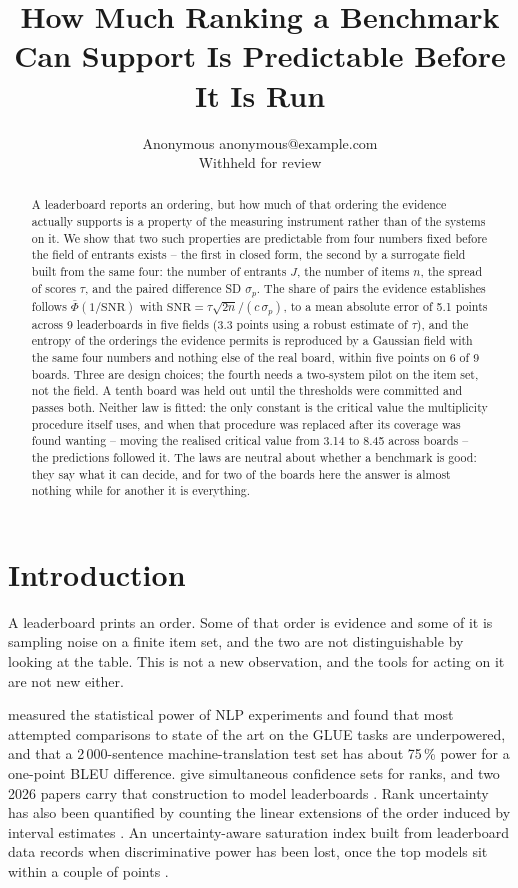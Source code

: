 \documentclass[10pt]{article}
\title{How Much Ranking a Benchmark Can Support Is Predictable Before It Is Run}
\author{\name Anonymous \email anonymous@example.com \\
      \addr Withheld for review}
\begin{document}
\maketitle

\begin{abstract}
A leaderboard reports an ordering, but how much of that ordering the
evidence actually supports is a property of the measuring instrument
rather than of the systems on it. We show that two such properties are
predictable from four numbers fixed before the field of entrants exists --
the first in closed form, the second by a surrogate field built from the
same four: the number of entrants $J$, the number of items $n$, the spread of
scores $\tau$, and the paired difference SD $\sigma_p$.
The share of pairs the evidence establishes follows
$\bar\Phi(1/\mathrm{SNR})$ with $\mathrm{SNR}=\tau\sqrt{2n}/(c\,\sigma_p)$,
to a mean absolute error of 5.1 points across 9 leaderboards in
five fields (3.3 points using a robust estimate of $\tau$), and
the entropy of the orderings the evidence permits is reproduced by a
Gaussian field with the same four numbers and nothing else of the real
board, within five points on 6 of 9 boards.
Three are design choices; the fourth needs a two-system pilot on the item
set, not the field. 
A tenth board was held out until the thresholds were committed and passes
both. Neither law is fitted: the only constant is the critical value the
multiplicity procedure itself uses, and when that procedure was replaced
after its coverage was found wanting -- moving the realised critical value
from 3.14 to 8.45 across boards -- the predictions followed it.
The laws are neutral about whether a benchmark is good: they say what it
can decide, and for two of the boards here the answer is almost nothing
while for another it is everything.
\end{abstract}

\section{Introduction}

A leaderboard prints an order. Some of that order is evidence and some of
it is sampling noise on a finite item set, and the two are not
distinguishable by looking at the table. This is not a new observation, and
the tools for acting on it are not new either.

\citet{card2020} measured the statistical power of NLP experiments and
found that most attempted comparisons to state of the art on the GLUE tasks
are underpowered, and that a 2\,000-sentence machine-translation test set
has about 75\,\% power for a one-point BLEU difference. \citet{mogstad2024}
give simultaneous confidence sets for ranks, and two 2026 papers carry that
construction to model leaderboards \citep{rankintervals}.
Rank uncertainty has also been quantified by counting the linear extensions
of the order induced by interval estimates \citep{uncertaintyranking}.
An uncertainty-aware saturation index built from leaderboard data records
when discriminative power has been lost, once the top models sit within a
couple of points \citep{saturation}.
\end{document}
